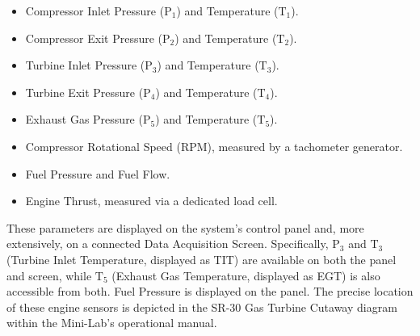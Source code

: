 \documentclass[
  12pt,
  oneside,
  a4paper,
  english,
  brazil]{abntex2}
\begin{document}
\begin{itemize}
    \item Compressor Inlet Pressure ($\mathrm{P}_{1}$) and Temperature ($\mathrm{T}_{1}$).
    \item Compressor Exit Pressure ($\mathrm{P}_{2}$) and Temperature ($\mathrm{T}_{2}$).
    \item Turbine Inlet Pressure ($\mathrm{P}_{3}$) and Temperature ($\mathrm{T}_{3}$).
    \item Turbine Exit Pressure ($\mathrm{P}_{4}$) and Temperature ($\mathrm{T}_{4}$).
    \item Exhaust Gas Pressure ($\mathrm{P}_{5}$) and Temperature ($\mathrm{T}_{5}$).
    \item Compressor Rotational Speed (RPM), measured by a tachometer generator.
    \item Fuel Pressure and Fuel Flow.
    \item Engine Thrust, measured via a dedicated load cell.
\end{itemize}

These parameters are displayed on the system's control panel and, more
extensively, on a connected Data Acquisition Screen. Specifically,
\(\mathrm{P}_{3}\) and \(\mathrm{T}_{3}\) (Turbine Inlet Temperature,
displayed as TIT) are available on both the panel and screen, while
\(\mathrm{T}_{5}\) (Exhaust Gas Temperature, displayed as EGT) is also
accessible from both. Fuel Pressure is displayed on the panel. The
precise location of these engine sensors is depicted in the SR-30 Gas
Turbine Cutaway diagram within the Mini-Lab's operational manual.
\end{document}
